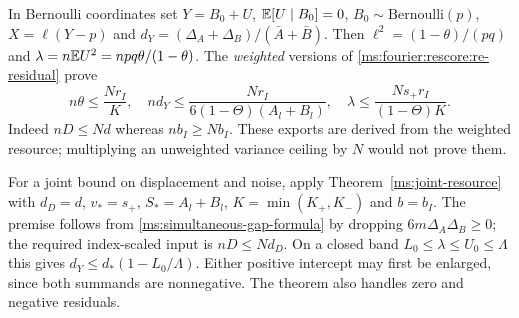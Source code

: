 In Bernoulli coordinates set $Y=B_0+U$, $\mathbb E[U\mid B_0]=0$,
$B_0\sim\mathrm{Bernoulli}(p)$, $X=\ell(Y-p)$ and
$d_Y=(\Delta_A+\Delta_B)/(\bar A+\bar B)$.
Then $\ell^2=(1-\theta)/(pq)$ and $\lambda=n\mathbb E U^2=npq\theta/(1-\theta)$.
The \emph{weighted} versions of \eqref{ms:fourier:rescore:re-residual} prove
\begin{equation}\label{ms:fourier:rescore:re-exports}
 n\theta\le\frac{Nr_I}{K},\quad
 nd_Y\le\frac{Nr_I}{6(1-\Theta)(A_l+B_l)},\quad
 \lambda\le\frac{Ns_+r_I}{(1-\Theta)K}.
\end{equation}
Indeed $nD\le Nd$ whereas $nb_I\ge Nb_I$.
These exports are derived from the weighted resource; multiplying an
unweighted variance ceiling by $N$ would not prove them.


For a joint bound on displacement and noise, apply
Theorem~\ref{ms:joint-resource} with
$d_D=d$, $v_*=s_+$, $S_*=A_l+B_l$, $K=\min(K_+,K_-)$ and $b=b_I$.
The premise follows from \eqref{ms:simultaneous-gap-formula} by dropping
$6m\Delta_A\Delta_B\ge0$; the required index-scaled input is $nD\le Nd_D$.
On a closed band $L_0\le\lambda\le U_0\le\Lambda$ this gives
$d_Y\le d_*(1-L_0/\Lambda)$.
Either positive intercept may first be enlarged, since both summands
are nonnegative. The theorem also handles zero and negative residuals.

